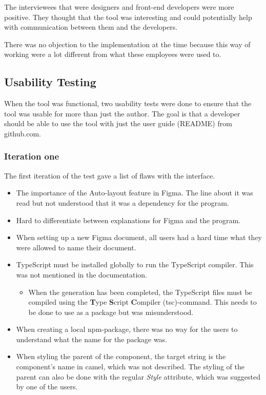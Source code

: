 The interviewees that were designers and front-end developers were more positive. They thought that the tool was interesting and could potentially help with communication between them and the developers.

There was no objection to the implementation at the time because this way of working were a lot different from what these employees were used to.  


\subsection{Usability Testing}%
\label{sub:Usability Testing}
When the tool was functional, two usability tests were done to ensure that the tool was usable for more than just the author. The goal is that a developer should be able to use the tool with just the user guide (README) from github.com. 

\subsubsection{Iteration one}%
\label{ssub:Iteration one}
The first iteration of the test gave a list of flaws with the interface.
\begin{itemize}
   \item The importance of the Auto-layout feature in Figma. The line about it was read but not understood that it was a dependency for the program. 
   \item Hard to differentiate between explanations for Figma and the program.
   \item When setting up a new Figma document, all users had a hard time what they were allowed to name their document.
   \item TypeScript must be installed globally to run the TypeScript compiler. This was not mentioned in the documentation. 
      \begin{itemize}
         \item When the generation has been completed, the TypeScript files must be compiled using the \textbf{T}ype \textbf{S}cript \textbf{C}ompiler (tsc)-command. This needs to be done to use as a package but was misunderstood.
      \end{itemize}
   \item When creating a local \acrshort{npm}-package, there was no way for the users to understand what the name for the package was. 
   \item When styling the parent of the component, the target string is the component's name in \gls{camel}, which was not described. The styling of the parent can also be done with the regular \textit{Style} attribute, which was suggested by one of the users.
\end{itemize}

